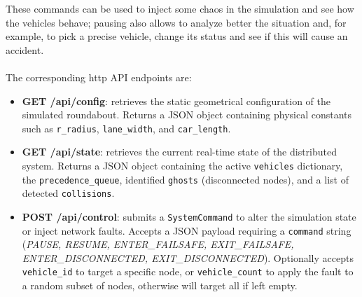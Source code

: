 These commands can be used to inject some chaos in the simulation and see how
the vehicles behave; pausing also allows to analyze better the situation and,
for example, to pick a precise vehicle, change its status and see if this will
cause an accident.
\\
\\
The corresponding http API endpoints are:
\begin{itemize}
    \item \textbf{GET /api/config}: retrieves the static geometrical
    configuration of the simulated roundabout. Returns a JSON object containing
    physical constants such as \texttt{r\_radius}, \texttt{lane\_width}, and
    \texttt{car\_length}.
    \item \textbf{GET /api/state}: retrieves the current real-time state of the
    distributed system. Returns a JSON object containing the active
    \texttt{vehicles} dictionary, the \texttt{precedence\_queue}, identified
    \texttt{ghosts} (disconnected nodes), and a list of detected
    \texttt{collisions}.
    \item \textbf{POST /api/control}: submits a \texttt{SystemCommand} to alter
    the simulation state or inject network faults. Accepts a JSON payload
    requiring a \texttt{command} string (\textit{PAUSE, RESUME, ENTER\_FAILSAFE,
    EXIT\_FAILSAFE,} \textit{ENTER\_DISCONNECTED, EXIT\_DISCONNECTED}).
    Optionally accepts \texttt{vehicle\_id} to target a specific node, or
    \texttt{vehicle\_count} to apply the fault to a random subset of nodes,
    otherwise will target all if left empty.
\end{itemize}
